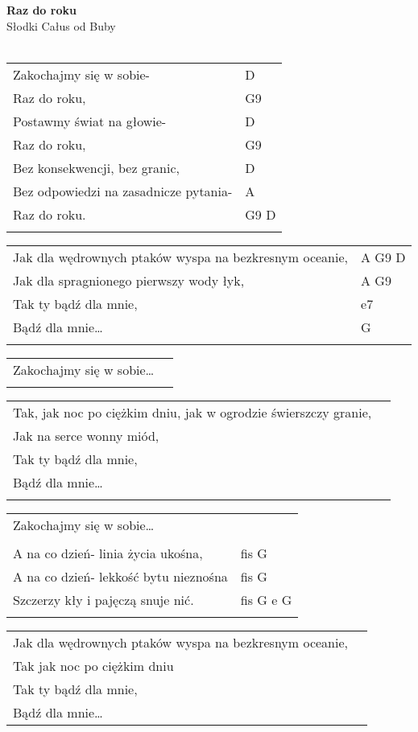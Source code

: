 \documentclass[a5paper]{article}
\begin{document}


\noindent
\fontsize{12pt}{15pt}\selectfont
\textbf{Raz do roku} \\
\fontsize{8pt}{10pt}\selectfont
Słodki Całus od Buby \\ \\
\fontsize{10pt}{12pt}\selectfont

\begin{tabular}{@{}p{8.00cm}p{3cm}@{}}
\noindent
Zakochajmy się w sobie- & D \\
Raz do roku, & G9 \\
Postawmy świat na głowie- & D \\
Raz do roku, & G9 \\
Bez konsekwencji, bez granic, & D \\
Bez odpowiedzi na zasadnicze pytania- & A \\
Raz do roku. & G9 D \\ \\
\end{tabular}

\noindent
\begin{tabular}{@{}p{9.00cm}p{3cm}@{}}
Jak dla wędrownych ptaków wyspa na bezkresnym oceanie, & A G9 D \\
Jak dla spragnionego pierwszy wody łyk, & A G9 \\
Tak ty bądź dla mnie, & e7 \\
Bądź dla mnie… & G \\ \\
\end{tabular}

\noindent
\begin{tabular}{@{}p{8.00cm}p{3cm}@{}}
Zakochajmy się w sobie… \\ \\
\end{tabular}

\noindent
\begin{tabular}{@{}p{9.00cm}p{3cm}@{}}
Tak, jak noc po ciężkim dniu, jak w ogrodzie świerszczy granie, \\
Jak na serce wonny miód, \\
Tak ty bądź dla mnie, \\
Bądź dla mnie… \\ \\
\end{tabular}

\noindent
\begin{tabular}{@{}p{8.00cm}p{3cm}@{}}
Zakochajmy się w sobie… \\ \\

A na co dzień- linia życia ukośna, & fis G \\
A na co dzień- lekkość bytu nieznośna & fis G \\
Szczerzy kły i pajęczą snuje nić. & fis G e G \\ \\
\end{tabular}

\noindent
\begin{tabular}{@{}p{9.00cm}p{3cm}@{}}
Jak dla wędrownych ptaków wyspa na bezkresnym oceanie, \\
Tak jak noc po ciężkim dniu \\
Tak ty bądź dla mnie, \\
Bądź dla mnie… 
\end{tabular}
\end{document}
